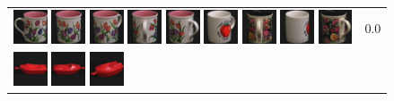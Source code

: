 \begin{figure}[!bp]
\begin{tabular}{m{11cm} | m{3cm} |}
\includegraphics[width=1cm]{coil/beeld-7.eps}
\includegraphics[width=1cm]{coil/beeld-8.eps}
\includegraphics[width=1cm]{coil/beeld-9.eps}
\includegraphics[width=1cm]{coil/beeld-11.eps}
\includegraphics[width=1cm]{coil/beeld-10.eps}
\includegraphics[width=1cm]{coil/beeld-39.eps}
\includegraphics[width=1cm]{coil/beeld-65.eps}
\includegraphics[width=1cm]{coil/beeld-38.eps}
\includegraphics[width=1cm]{coil/beeld-64.eps}
& {\scriptsize 0.0}
\\
\includegraphics[width=1cm]{coil/beeld-18.eps}
\includegraphics[width=1cm]{coil/beeld-19.eps}
\includegraphics[width=1cm]{coil/beeld-21.eps}

\end{tabular}
\end{figure}
